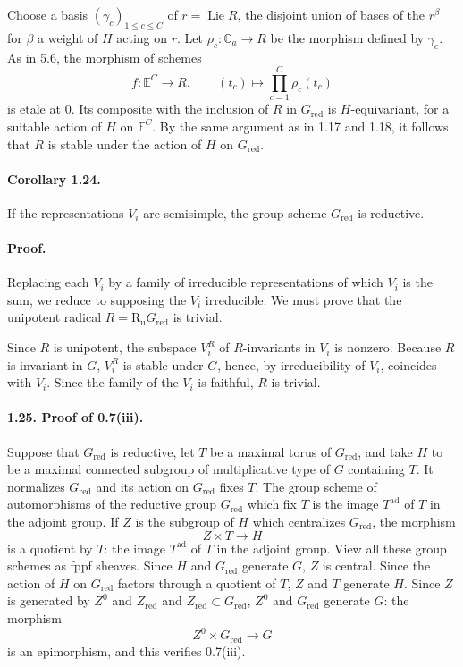 \documentclass[11pt]{article}
\newcommand{\Ga}{\mathbb{G}_a}
\newcommand{\Lie}{\operatorname{Lie}}
\newcommand{\Ru}{\operatorname{R_u}}
\newcommand{\ad}{\operatorname{ad}}
\newcommand{\red}{\mathrm{red}}
\theoremstyle{plain}
\theoremstyle{definition}
\begin{document}
Choose a basis $(\gamma_c)_{1\le c\le C}$ of $r=\Lie R$, the disjoint union of bases of the $r^\beta$ for $\beta$ a weight of $H$ acting on $r$. Let $\rho_c:\Ga\to R$ be the morphism defined by $\gamma_c$. As in 5.6, the morphism of schemes
\[
   f:\mathbb E^C\longrightarrow R,
   \qquad (t_c)\longmapsto\prod_{c=1}^{C}\rho_c(t_c)
\]
is etale at $0$. Its composite with the inclusion of $R$ in $G_{\red}$ is $H$-equivariant, for a suitable action of $H$ on $\mathbb E^C$. By the same argument as in 1.17 and 1.18, it follows that $R$ is stable under the action of $H$ on $G_{\red}$.

\paragraph{Corollary 1.24.} If the representations $V_i$ are semisimple, the group scheme $G_{\red}$ is reductive.

\paragraph{Proof.} Replacing each $V_i$ by a family of irreducible representations of which $V_i$ is the sum, we reduce to supposing the $V_i$ irreducible. We must prove that the unipotent radical $R=\Ru G_{\red}$ is trivial.

Since $R$ is unipotent, the subspace $V_i^R$ of $R$-invariants in $V_i$ is nonzero. Because $R$ is invariant in $G$, $V_i^R$ is stable under $G$, hence, by irreducibility of $V_i$, coincides with $V_i$. Since the family of the $V_i$ is faithful, $R$ is trivial.

\paragraph{1.25. Proof of 0.7(iii).} Suppose that $G_{\red}$ is reductive, let $T$ be a maximal torus of $G_{\red}$, and take $H$ to be a maximal connected subgroup of multiplicative type of $G$ containing $T$. It normalizes $G_{\red}$ and its action on $G_{\red}$ fixes $T$. The group scheme of automorphisms of the reductive group $G_{\red}$ which fix $T$ is the image $T^{\ad}$ of $T$ in the adjoint group. If $Z$ is the subgroup of $H$ which centralizes $G_{\red}$, the morphism
\[
   Z\times T\longrightarrow H
\]
is a quotient by $T$: the image $T^{\ad}$ of $T$ in the adjoint group. View all these group schemes as fppf sheaves. Since $H$ and $G_{\red}$ generate $G$, $Z$ is central. Since the action of $H$ on $G_{\red}$ factors through a quotient of $T$, $Z$ and $T$ generate $H$. Since $Z$ is generated by $Z^0$ and $Z_{\red}$ and $Z_{\red}\subset G_{\red}$, $Z^0$ and $G_{\red}$ generate $G$: the morphism
\[
   Z^0\times G_{\red}\longrightarrow G
\]
is an epimorphism, and this verifies 0.7(iii).
\end{document}
